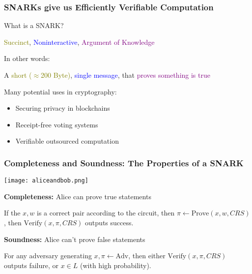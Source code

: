 \documentclass{beamer}
\begin{document}
\begin{frame}

    \frametitle{SNARKs give us Efficiently Verifiable Computation}

    What is a SNARK?
    \begin{center}
        \textcolor{olive}{Succinct}, \textcolor{blue}{Noninteractive}, \textcolor{purple}{Argument of Knowledge}       
    \end{center}

    In other words:

    \begin{center}
        A \textcolor{olive}{short ($\approx$200 Byte)}, \textcolor{blue}{single message}, that \textcolor{purple}{proves something is true}        
    \end{center}

    Many potential uses in cryptography:

    \begin{itemize}
        \item Securing privacy in blockchains
        \item Receipt-free voting systems
        \item Verifiable outsourced computation 
    \end{itemize}    

\end{frame}

\begin{frame}
    
    \frametitle{Completeness and Soundness: The Properties of a SNARK}




    \begin{center}
        \texttt{[image: aliceandbob.png]}        
    \end{center}

    \textbf{Completeness:} Alice can prove true statements
    
    If the $x, w$ is a correct pair according to the circuit, then $\pi \gets \text{Prove}(x, w, CRS)$, then $\text{Verify}(x, \pi, CRS)$ outputs success.

    \textbf{Soundness:} Alice can't prove false statements
    
    For any adversary generating $x, \pi \gets \text{Adv}$, then either $\text{Verify}(x, \pi, CRS)$ outputs failure, or $x \in L$ (with high probability).


\end{frame}
\end{document}
